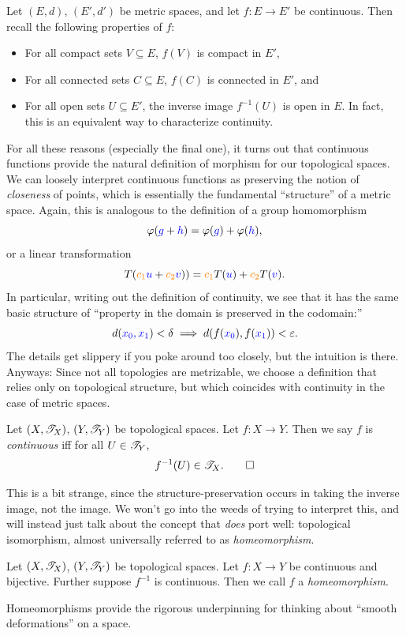 \documentclass{fkpaper}
\begin{document}
\begin{multicols}{2}
  Let $(E,d)$, $(E', d')$ be metric spaces, and let $f : E \to E'$ be
  continuous. Then recall the following properties of $f$:
  \begin{itemize}
    \item For all compact sets $V \subseteq E$, $f(V)$ is compact in
      $E'$,
    \item For all connected sets $C \subseteq E$, $f(C)$ is connected
      in $E'$, and
    \item For all open sets $U \subseteq E'$, the inverse image
      $f^{-1}(U)$ is open in $E$. In fact, this is an equivalent way
      to characterize continuity.
  \end{itemize}
  For all these reasons (especially the final one), it turns out that
  continuous functions provide the natural definition of morphism for
  our topological spaces. We can loosely interpret continuous
  functions as preserving the notion of \emph{closeness} of points,
  which is essentially the fundamental ``structure'' of a metric
  space. Again, this is analogous to the definition of a group
  homomorphism
  \[
    \varphi({\color{blue}g} + {\color{blue}h}) = \varphi({\color{blue}
      g}) + \varphi({\color{blue} h}),
  \]
  or a linear transformation
  \[
    T({\color{orange} c_1} {\color{blue}u} + {\color{orange} c_2}
    {\color{blue} v})) = {\color{orange} c_1} T({\color{blue} u}) +
    {\color{orange} c_2} T({\color{blue} v}).
  \]
  In particular, writing out the definition of continuity, we see that
  it has the same basic structure of ``property in the domain is
  preserved in the codomain:''
  \[
    d({\color{blue} x_0, x_1}) < \delta \implies
    d(f({\color{blue}x_0}), f({\color{blue}x_1})) < \varepsilon.
  \]
  The details get slippery if you poke around too closely, but the
  intuition is there. Anyways: Since not all topologies are
  metrizable, we choose a definition that relies only on topological
  structure, but which coincides with continuity in the case of metric
  spaces.
  \begin{definition}
    Let $(X, {\mathscr{T}}_X)$, $(Y, {\mathscr{T}}_Y)$ be topological spaces. Let $f :
    X \to Y$. Then we say $f$ is \emph{continuous} iff for all $U\in
    {\mathscr{T}}_Y$,
    \[
      f^{-1}(U) \in {\mathscr{T}}_X. \qedhere
    \]
  \end{definition}
  This is a bit strange, since the structure-preservation occurs in
  taking the inverse image, not the image. We won't go into the weeds
  of trying to interpret this, and will instead just talk about the
  concept that \emph{does} port well: topological isomorphism, almost
  universally referred to as \emph{homeomorphism}.
  \begin{definition}[Homeomorphism]
    Let $(X, {\mathscr{T}}_X)$, $(Y, {\mathscr{T}}_Y)$ be topological spaces. Let $f :
    X \to Y$ be continuous and bijective. Further suppose $f^{-1}$ is
    continuous. Then we call $f$ a \emph{homeomorphism}.
  \end{definition}
  Homeomorphisms provide the rigorous underpinning for thinking about
  ``smooth deformations'' on a space.


\end{multicols}
\end{document}
